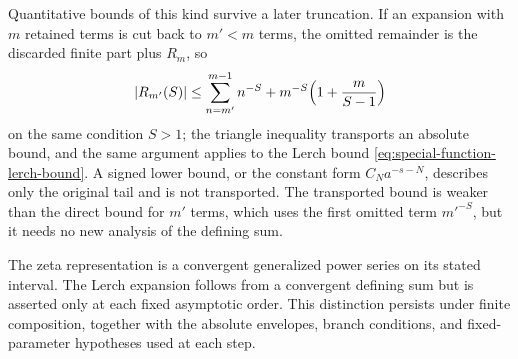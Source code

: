 Quantitative bounds of this kind survive a later truncation. If an
expansion with $m$ retained terms is cut back to $m'<m$ terms, the
omitted remainder is the discarded finite part plus $R_m$, so
\[
 |R_{m'}(S)|\le\sum_{n=m'}^{m-1}n^{-S}+m^{-S}\Bigl(1+\frac{m}{S-1}\Bigr)
\]
on the same condition $S>1$; the triangle inequality transports an
absolute bound, and the same argument applies to the Lerch bound
\eqref{eq:special-function-lerch-bound}. A signed lower bound, or the
constant form $C_Na^{-s-N}$, describes only the original tail and is
not transported. The transported bound is weaker than the direct bound
for $m'$ terms, which uses the first omitted term $m'^{-S}$, but it
needs no new analysis of the defining sum.

The zeta representation is a convergent generalized power series on
its stated interval. The Lerch expansion follows from a convergent
defining sum but is asserted only at each fixed asymptotic order.
This distinction persists under finite composition, together with the
absolute envelopes, branch conditions, and fixed-parameter hypotheses
used at each step.
